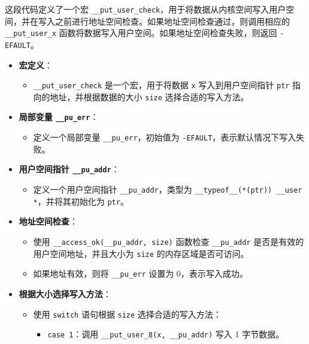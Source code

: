 \documentclass[12pt,hyperref,a4paper,UTF8]{ctexart}
\begin{document}
这段代码定义了一个宏 \lstinline|__put_user_check|，用于将数据从内核空间写入用户空间，并在写入之前进行地址空间检查。如果地址空间检查通过，则调用相应的 \lstinline|__put_user_x| 函数将数据写入用户空间。如果地址空间检查失败，则返回 \lstinline|-EFAULT|。

\begin{itemize}
    \item \textbf{宏定义}：
          \begin{itemize}
              \item \lstinline|__put_user_check| 是一个宏，用于将数据 \lstinline|x| 写入到用户空间指针 \lstinline|ptr| 指向的地址，并根据数据的大小 \lstinline|size| 选择合适的写入方法。
          \end{itemize}
    \item \textbf{局部变量 \lstinline|__pu_err|}：
          \begin{itemize}
              \item 定义一个局部变量 \lstinline|__pu_err|，初始值为 \lstinline|-EFAULT|，表示默认情况下写入失败。
          \end{itemize}
    \item \textbf{用户空间指针 \lstinline|__pu_addr|}：
          \begin{itemize}
              \item 定义一个用户空间指针 \lstinline|__pu_addr|，类型为 \lstinline|__typeof__(*(ptr)) __user *|，并将其初始化为 \lstinline|ptr|。
          \end{itemize}
    \item \textbf{地址空间检查}：
          \begin{itemize}
              \item 使用 \lstinline|__access_ok(__pu_addr, size)| 函数检查 \lstinline|__pu_addr| 是否是有效的用户空间地址，并且大小为 \lstinline|size| 的内存区域是否可访问。
              \item 如果地址有效，则将 \lstinline|__pu_err| 设置为 0，表示写入成功。
          \end{itemize}
    \item \textbf{根据大小选择写入方法}：
          \begin{itemize}
              \item 使用 \lstinline|switch| 语句根据 \lstinline|size| 选择合适的写入方法：
                    \begin{itemize}
                        \item \lstinline|case 1|：调用 \lstinline|__put_user_8(x, __pu_addr)| 写入 1 字节数据。

\end{itemize}
\end{itemize}
\end{itemize}
\end{document}
